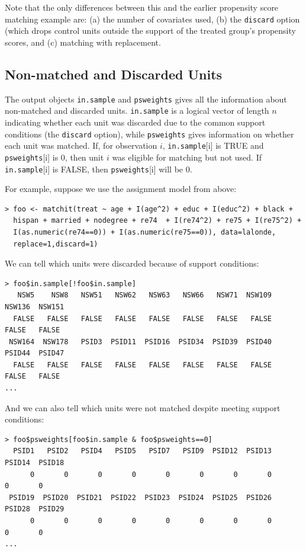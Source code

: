 \documentclass[oneside,letterpaper,titlepage]{article}
\begin{document}
Note that the only differences between this and the earlier propensity
score matching example are: (a) the number of covariates used, (b) the
\texttt{discard} option (which drops control units outside the support
of the treated group's propensity scores, and (c) matching with
replacement.

\subsection{Non-matched and Discarded Units}

The output objects \texttt{in.sample} and \texttt{psweights} gives all
the information about non-matched and discarded units.
\texttt{in.sample} is a logical vector of length $n$ indicating
whether each unit was discarded due to the common support conditions
(the \texttt{discard} option), while \texttt{psweights} gives
information on whether each unit was matched.  If, for observation
$i$, \texttt{in.sample}[i] is TRUE and \texttt{psweights}[i] is $0$,
then unit $i$ was eligible for matching but not used.  If
\texttt{in.sample}[i] is FALSE, then \texttt{psweights}[i] will be
$0$.

For example, suppose we use the assignment model from above:

\begin{verbatim}
> foo <- matchit(treat ~ age + I(age^2) + educ + I(educ^2) + black +
  hispan + married + nodegree + re74  + I(re74^2) + re75 + I(re75^2) +
  I(as.numeric(re74==0)) + I(as.numeric(re75==0)), data=lalonde,
  replace=1,discard=1)
\end{verbatim}

We can tell which units were discarded because of support conditions:

\begin{verbatim}
> foo$in.sample[!foo$in.sample]
   NSW5    NSW8   NSW51   NSW62   NSW63   NSW66   NSW71  NSW109  NSW136  NSW151
  FALSE   FALSE   FALSE   FALSE   FALSE   FALSE   FALSE   FALSE   FALSE   FALSE
 NSW164  NSW178   PSID3  PSID11  PSID16  PSID34  PSID39  PSID40  PSID44  PSID47
  FALSE   FALSE   FALSE   FALSE   FALSE   FALSE   FALSE   FALSE   FALSE   FALSE
...
\end{verbatim}

And we can also tell which units were not matched despite meeting
support conditions:

\begin{verbatim}
> foo$psweights[foo$in.sample & foo$psweights==0]
  PSID1   PSID2   PSID4   PSID5   PSID7   PSID9  PSID12  PSID13  PSID14  PSID18
      0       0       0       0       0       0       0       0       0       0
 PSID19  PSID20  PSID21  PSID22  PSID23  PSID24  PSID25  PSID26  PSID28  PSID29
      0       0       0       0       0       0       0       0       0       0
...
\end{verbatim} %
\end{document}

